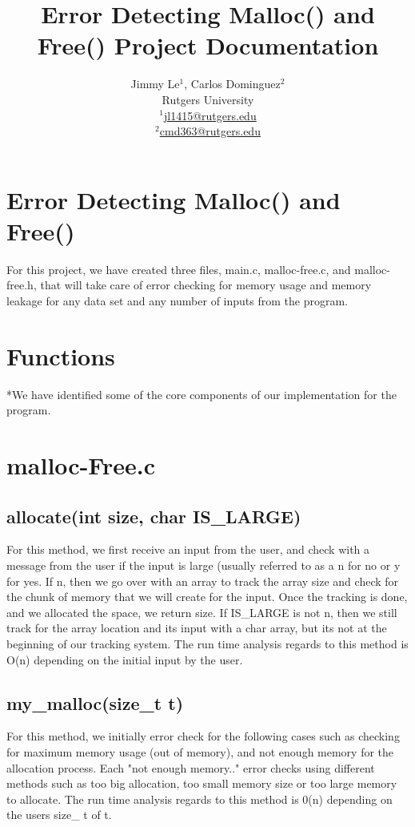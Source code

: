 \documentclass{article}
\title{ Error Detecting Malloc() and Free() Project Documentation\\}
\date{}
\author{Jimmy Le$^{1}$, Carlos Dominguez$^{2}$\\
	Rutgers University\\
	\underline{$^{1}$jl1415@rutgers.edu}\\
	\underline{$^{2}$cmd363@rutgers.edu}}
\makeatletter
\renewcommand{\maketitle}{\bgroup\setlength{\parindent}{0pt}
\begin{flushleft}
  \textbf{\@title}
  \@author
\end{flushleft}\egroup
}
\makeatother
\begin{document}
\maketitle

\section{Error Detecting Malloc() and Free()}
For this project, we have created three files, main.c, malloc-free.c, and malloc-free.h, that will take care of error checking for memory usage and memory leakage for any data set
and any number of inputs from the program.

\section{Functions}
*We have identified some of the core components of our implementation for the program.

\section {malloc-Free.c}

\subsection*{allocate(int size, char IS\_LARGE)}
For this method, we first receive an input from the user, and check with a message from the user if the input is large (usually referred to as a n for no or y for yes.  If n, then we go over with an array to track the array size and check for the chunk of memory that we will create for the input. Once the tracking is done, and we allocated the space, we return size.  If IS\_LARGE is not n, then we still track for the array location and its input with a char array, but its not at the beginning of our tracking system.
The run time analysis regards to this method is O(n) depending on the initial input by the user. 

\subsection*{my\_malloc(size\_t t)}
For this method, we initially error check for the following cases such as checking for maximum memory usage (out of memory), and not enough memory for the allocation process.  Each "not enough memory.." error checks using different methods such as too big allocation, too small memory size or too large memory to allocate.
The run time analysis regards to this method is 0(n) depending on the users size\_ t of t.
\end{document}
